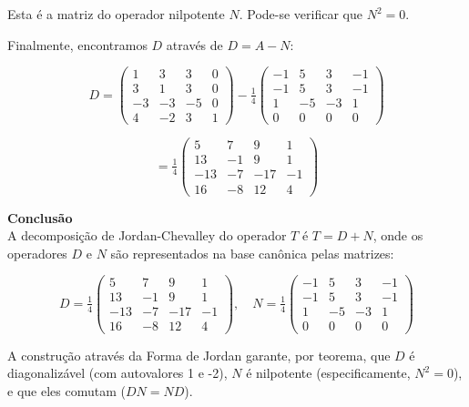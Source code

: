Esta é a matriz do operador nilpotente $N$. Pode-se verificar que $N^2=0$.

Finalmente, encontramos $D$ através de $D=A-N$:

\[
D = \begin{pmatrix}
1 & 3 & 3 & 0 \\
3 & 1 & 3 & 0 \\
-3 & -3 & -5 & 0 \\
4 & -2 & 3 & 1
\end{pmatrix}
- \tfrac{1}{4}
\begin{pmatrix}
-1 & 5 & 3 & -1 \\
-1 & 5 & 3 & -1 \\
1 & -5 & -3 & 1 \\
0 & 0 & 0 & 0
\end{pmatrix}
\]

\[
= \tfrac{1}{4}\begin{pmatrix}
5 & 7 & 9 & 1 \\
13 & -1 & 9 & 1 \\
-13 & -7 & -17 & -1 \\
16 & -8 & 12 & 4
\end{pmatrix}
\]

\bigskip

\textbf{Conclusão} \\

A decomposição de Jordan-Chevalley do operador $T$ é $T = D+N$, onde os operadores $D$ e $N$ são representados na base canônica pelas matrizes:

\[
D = \tfrac{1}{4}\begin{pmatrix}
5 & 7 & 9 & 1 \\
13 & -1 & 9 & 1 \\
-13 & -7 & -17 & -1 \\
16 & -8 & 12 & 4
\end{pmatrix},
\quad
N = \tfrac{1}{4}\begin{pmatrix}
-1 & 5 & 3 & -1 \\
-1 & 5 & 3 & -1 \\
1 & -5 & -3 & 1 \\
0 & 0 & 0 & 0
\end{pmatrix}
\]

A construção através da Forma de Jordan garante, por teorema, que $D$ é diagonalizável (com autovalores 1 e -2), $N$ é nilpotente (especificamente, $N^2=0$), e que eles comutam ($DN=ND$).